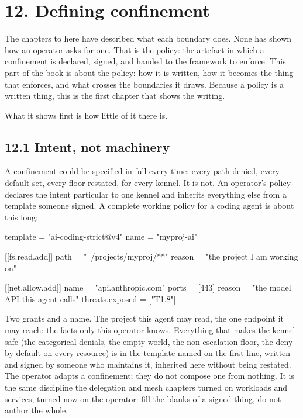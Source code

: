 \hypertarget{defining-confinement}{%
\chapter{12. Defining confinement}\label{defining-confinement}}

The chapters to here have described what each boundary does. None has
shown how an operator asks for one. That is the policy: the artefact in
which a confinement is declared, signed, and handed to the framework to
enforce. This part of the book is about the policy: how it is written,
how it becomes the thing that enforces, and what crosses the boundaries
it draws. Because a policy is a written thing, this is the first chapter
that shows the writing.

What it shows first is how little of it there is.

\hypertarget{intent-not-machinery}{%
\section{12.1 Intent, not machinery}\label{intent-not-machinery}}

A confinement could be specified in full every time: every path denied,
every default set, every floor restated, for every kennel. It is not. An
operator's policy declares the intent particular to one kennel and
inherits everything else from a template someone signed. A complete
working policy for a coding agent is about this long:

\begin{kennelcode}
template = "ai-coding-strict@v4"
name = "myproj-ai"

[[fs.read.add]]
path = "~/projects/myproj/**"
reason = "the project I am working on"

[[net.allow.add]]
name = "api.anthropic.com"
ports = [443]
reason = "the model API this agent calls"
threats.exposed = ["T1.8"]
\end{kennelcode}

Two grants and a name. The project this agent may read, the one endpoint
it may reach: the facts only this operator knows. Everything that makes
the kennel safe (the categorical denials, the empty world, the
non-escalation floor, the deny-by-default on every resource) is in the
template named on the first line, written and signed by someone who
maintains it, inherited here without being restated. The operator adapts
a confinement; they do not compose one from nothing. It is the same
discipline the delegation and mesh chapters turned on workloads and
services, turned now on the operator: fill the blanks of a signed thing,
do not author the whole.

